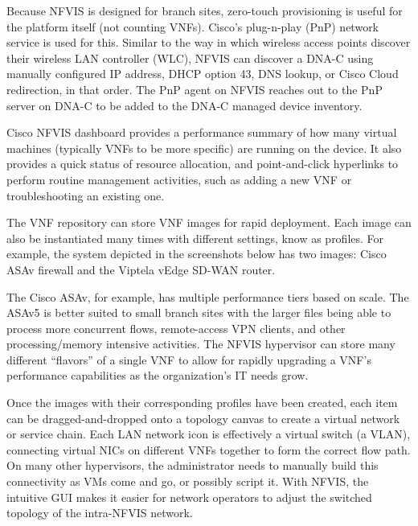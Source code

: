 Because NFVIS is designed for branch sites, zero-touch provisioning is useful
for the platform itself (not counting VNFs). Cisco's plug-n-play (PnP) network
service is used for this. Similar to the way in which wireless access points
discover their wireless LAN controller (WLC), NFVIS can discover a DNA-C using
manually configured IP address, DHCP option 43, DNS lookup, or Cisco Cloud
redirection, in that order. The PnP agent on NFVIS reaches out to the PnP
server on DNA-C to be added to the DNA-C managed device inventory.

Cisco NFVIS dashboard provides a performance summary of how many virtual machines
(typically VNFs to be more specific) are running on the device. It also
provides a quick status of resource allocation, and point-and-click hyperlinks
to perform routine management activities, such as adding a new VNF or
troubleshooting an existing one.


The VNF repository can store VNF images for rapid deployment. Each image can
also be instantiated many times with different settings, know as profiles. For
example, the system depicted in the screenshots below has two images: Cisco
ASAv firewall and the Viptela vEdge SD-WAN router.


The Cisco ASAv, for example, has multiple performance tiers based on scale.
The ASAv5 is better suited to small branch sites with the larger files being
able to process more concurrent flows, remote-access VPN clients, and other
processing/memory intensive activities. The NFVIS hypervisor can store many
different ``flavors'' of a single VNF to allow for rapidly upgrading a VNF's
performance capabilities as the organization's IT needs grow.


Once the images with their corresponding profiles have been created, each item
can be dragged-and-dropped onto a topology canvas to create a virtual network
or service chain. Each LAN network icon is effectively a virtual switch (a
VLAN), connecting virtual NICs on different VNFs together to form the correct
flow path. On many other hypervisors, the administrator needs to manually
build this connectivity as VMs come and go, or possibly script it. With NFVIS,
the intuitive GUI makes it easier for network operators to adjust the switched
topology of the intra-NFVIS network.

